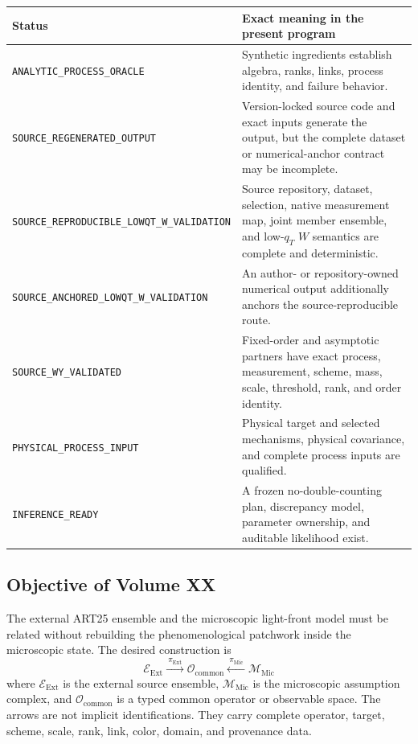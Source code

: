 \documentclass[11pt]{article}
\newcommand{\cO}{\mathcal O}
\newcommand{\cM}{\mathcal M}
\newcommand{\cE}{\mathcal E}
\newcommand{\Ext}{\ensuremath{\mathrm{Ext}}}
\newcommand{\Mic}{\ensuremath{\mathrm{Mic}}}
\begin{document}
\begin{longtable}{L{0.31\textwidth}L{0.60\textwidth}}
\toprule
Status & Exact meaning in the present program\\
\midrule
\endhead
\texttt{ANALYTIC\_PROCESS\_ORACLE} & Synthetic ingredients establish algebra, ranks, links, process identity, and failure behavior.\\
\texttt{SOURCE\_REGENERATED\_OUTPUT} & Version-locked source code and exact inputs generate the output, but the complete dataset or numerical-anchor contract may be incomplete.\\
\nolinkurl{SOURCE_REPRODUCIBLE_LOWQT_W_VALIDATION} & Source repository, dataset, selection, native measurement map, joint member ensemble, and low-\(q_T\) \(W\) semantics are complete and deterministic.\\
\nolinkurl{SOURCE_ANCHORED_LOWQT_W_VALIDATION} & An author- or repository-owned numerical output additionally anchors the source-reproducible route.\\
\texttt{SOURCE\_WY\_VALIDATED} & Fixed-order and asymptotic partners have exact process, measurement, scheme, mass, scale, threshold, rank, and order identity.\\
\texttt{PHYSICAL\_PROCESS\_INPUT} & Physical target and selected mechanisms, physical covariance, and complete process inputs are qualified.\\
\texttt{INFERENCE\_READY} & A frozen no-double-counting plan, discrepancy model, parameter ownership, and auditable likelihood exist.\\
\bottomrule
\end{longtable}

\subsection{Objective of Volume XX}

The external ART25 ensemble and the microscopic light-front model must be related without rebuilding the phenomenological patchwork inside the microscopic state.  The desired construction is
\begin{equation}
 \boxed{
 \cE_{\Ext}
 \xrightarrow{\ \pi_{\Ext}\ }
 \cO_{\mathrm{common}}
 \xleftarrow{\ \pi_{\Mic}\ }
 \cM_{\Mic}
 }
 \label{eq:bridge-span}
\end{equation}
where \(\cE_{\Ext}\) is the external source ensemble, \(\cM_{\Mic}\) is the microscopic assumption complex, and \(\cO_{\mathrm{common}}\) is a typed common operator or observable space.  The arrows are not implicit identifications.  They carry complete operator, target, scheme, scale, rank, link, color, domain, and provenance data.
\end{document}
